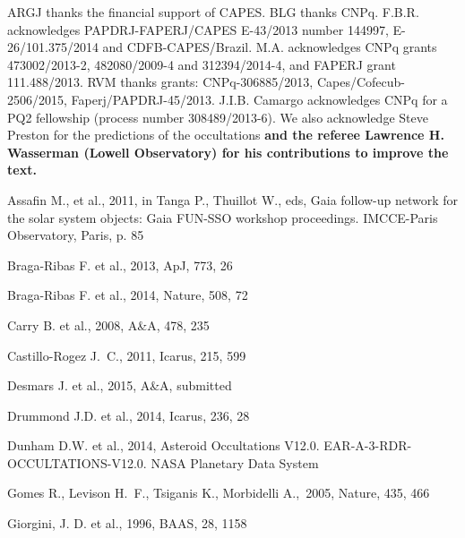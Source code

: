 \documentclass[useAMS,usenatbib]{mn2e}
\begin{document}
ARGJ thanks the financial support of CAPES. BLG thanks CNPq. F.B.R. acknowledges PAPDRJ-FAPERJ/CAPES E-43/2013 number 144997, E-26/101.375/2014 and CDFB-CAPES/Brazil. M.A. acknowledges CNPq grants 473002/2013-2, 482080/2009-4 and 312394/2014-4, and FAPERJ grant 111.488/2013. RVM thanks grants: CNPq-306885/2013, Capes/Cofecub-2506/2015, Faperj/PAPDRJ-45/2013. J.I.B. Camargo acknowledges CNPq for a PQ2 fellowship (process number 308489/2013-6). We also acknowledge Steve Preston for the predictions of the occultations \textbf{and the referee Lawrence H. Wasserman (Lowell Observatory) for his contributions to improve the text.}


\begin{thebibliography}{99}

 Assafin M., et al., 2011, in Tanga P., Thuillot W., eds, Gaia follow-up network for the solar system objects: Gaia FUN-SSO workshop proceedings. IMCCE-Paris Observatory, Paris, p. 85

 Braga-Ribas F. et al., 2013,
ApJ, 773, 26

 Braga-Ribas F. et al., 2014,
Nature, 508, 72

 Carry B. et al., 2008,
A\&A, 478, 235

 Castillo-Rogez J.~C.,
2011, Icarus, 215, 599 

 Desmars J. et al., 2015, A\&A, submitted

 Drummond J.D. et al., 2014,
Icarus, 236, 28

Dunham D.W. et al., 2014, Asteroid Occultations V12.0. EAR-A-3-RDR-OCCULTATIONS-V12.0. NASA Planetary Data System

 Gomes R., Levison H.~F., Tsiganis K., Morbidelli A.,\ 2005, Nature, 435, 466 

 Giorgini, J. D. et al., 1996, BAAS, 28, 1158



\end{thebibliography}
\end{document}
